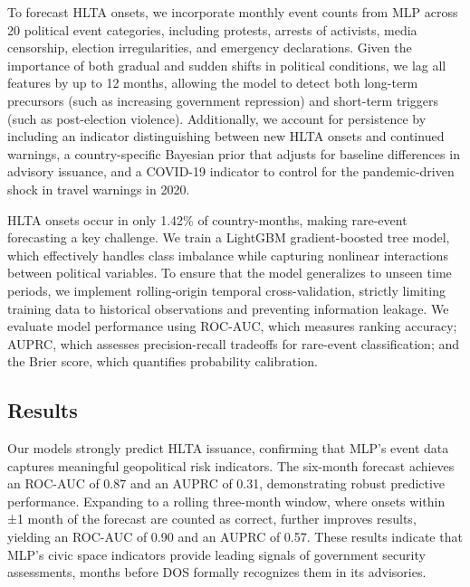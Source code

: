 \documentclass[
  letterpaper,
  DIV=11,
  numbers=noendperiod]{scrartcl}
\begin{document}
To forecast HLTA onsets, we incorporate monthly event counts from MLP
across 20 political event categories, including protests, arrests of
activists, media censorship, election irregularities, and emergency
declarations. Given the importance of both gradual and sudden shifts in
political conditions, we lag all features by up to 12 months, allowing
the model to detect both long-term precursors (such as increasing
government repression) and short-term triggers (such as post-election
violence). Additionally, we account for persistence by including an
indicator distinguishing between new HLTA onsets and continued warnings,
a country-specific Bayesian prior that adjusts for baseline differences
in advisory issuance, and a COVID-19 indicator to control for the
pandemic-driven shock in travel warnings in 2020.

HLTA onsets occur in only 1.42\% of country-months, making rare-event
forecasting a key challenge. We train a LightGBM gradient-boosted tree
model, which effectively handles class imbalance while capturing
nonlinear interactions between political variables. To ensure that the
model generalizes to unseen time periods, we implement rolling-origin
temporal cross-validation, strictly limiting training data to historical
observations and preventing information leakage. We evaluate model
performance using ROC-AUC, which measures ranking accuracy; AUPRC, which
assesses precision-recall tradeoffs for rare-event classification; and
the Brier score, which quantifies probability calibration.

\hypertarget{results}{%
\subsection{Results}\label{results}}

Our models strongly predict HLTA issuance, confirming that MLP's event
data captures meaningful geopolitical risk indicators. The six-month
forecast achieves an ROC-AUC of 0.87 and an AUPRC of 0.31, demonstrating
robust predictive performance. Expanding to a rolling three-month
window, where onsets within ±1 month of the forecast are counted as
correct, further improves results, yielding an ROC-AUC of 0.90 and an
AUPRC of 0.57. These results indicate that MLP's civic space indicators
provide leading signals of government security assessments, months
before DOS formally recognizes them in its advisories.
\end{document}
